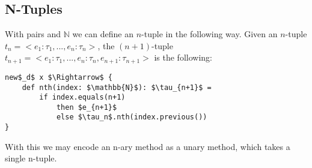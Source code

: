 \documentclass{llncs}
\begin{document}
\subsection{N-Tuples}

With pairs and $\mathbb{N}$ we can define an $n$-tuple in the following way. Given an $n$-tuple $t_n = <e_1: \tau_1, ..., e_n: \tau_n>$, the $(n+1)$-tuple $t_{n+1} = <e_1: \tau_1, ..., e_n: \tau_n, e_{n+1}: \tau_{n+1}>$ is the following:

\begin{lstlisting}
new$_d$ x $\Rightarrow$ {
    def nth(index: $\mathbb{N}$): $\tau_{n+1}$ =
        if index.equals(n+1)
            then $e_{n+1}$
            else $\tau_n$.nth(index.previous())
}
\end{lstlisting}

\noindent
With this we may encode an n-ary method as a unary method, which takes a single n-tuple.
\end{document}
